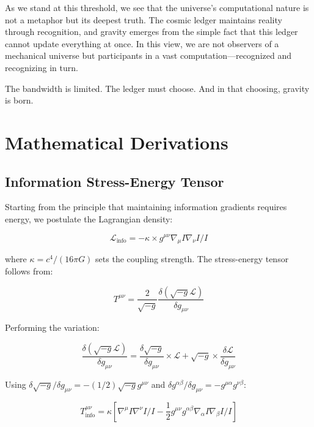 \documentclass[12pt,letterpaper]{article}
\begin{document}
As we stand at this threshold, we see that the universe's computational nature is not a metaphor but its deepest truth. The cosmic ledger maintains reality through recognition, and gravity emerges from the simple fact that this ledger cannot update everything at once. In this view, we are not observers of a mechanical universe but participants in a vast computation---recognized and recognizing in turn.

The bandwidth is limited. The ledger must choose. And in that choosing, gravity is born.

\appendix

\section{Mathematical Derivations}

\subsection{Information Stress-Energy Tensor}

Starting from the principle that maintaining information gradients requires energy, we postulate the Lagrangian density:

\begin{equation}
\mathcal{L}_{\text{info}} = -\kappa \times g^{\mu\nu} \nabla_\mu I \nabla_\nu I / I
\end{equation}

where $\kappa = c^4/(16\pi G)$ sets the coupling strength. The stress-energy tensor follows from:

\begin{equation}
T^{\mu\nu} = \frac{2}{\sqrt{-g}} \frac{\delta(\sqrt{-g}\mathcal{L})}{\delta g_{\mu\nu}}
\end{equation}

Performing the variation:

\begin{equation}
\frac{\delta(\sqrt{-g}\mathcal{L})}{\delta g_{\mu\nu}} = \frac{\delta\sqrt{-g}}{\delta g_{\mu\nu}} \times \mathcal{L} + \sqrt{-g} \times \frac{\delta\mathcal{L}}{\delta g_{\mu\nu}}
\end{equation}

Using $\delta\sqrt{-g}/\delta g_{\mu\nu} = -(1/2)\sqrt{-g}g^{\mu\nu}$ and $\delta g^{\alpha\beta}/\delta g_{\mu\nu} = -g^{\mu\alpha}g^{\nu\beta}$:

\begin{equation}
T^{\mu\nu}_{\text{info}} = \kappa\left[\nabla^\mu I \nabla^\nu I / I - \frac{1}{2}g^{\mu\nu}g^{\alpha\beta}\nabla_\alpha I \nabla_\beta I / I\right]
\end{equation}
\end{document}
